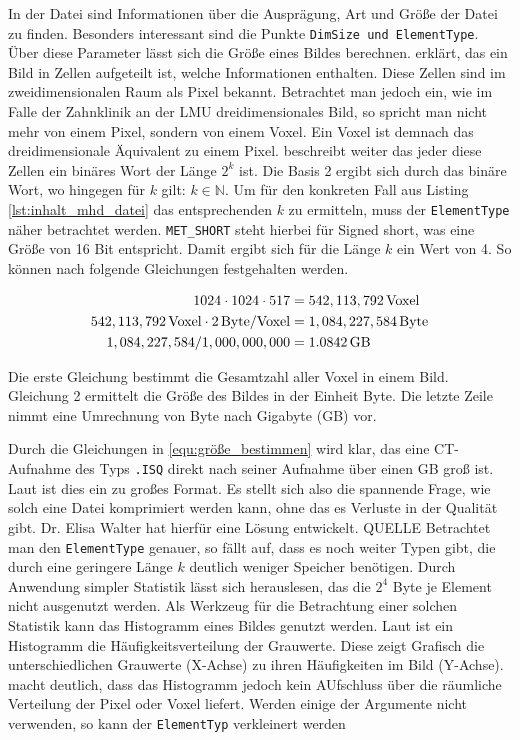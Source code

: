 In der Datei sind Informationen über die Ausprägung, Art und Größe der Datei zu finden.
Besonders interessant sind die Punkte \texttt{DimSize und ElementType}. Über
diese Parameter lässt sich die Größe eines Bildes berechnen. \citet[Seite 10-11]{burger2009}
erklärt, das ein Bild in Zellen aufgeteilt ist, welche Informationen enthalten.
Diese Zellen sind im zweidimensionalen Raum als Pixel bekannt. Betrachtet man jedoch
ein, wie im Falle der Zahnklinik an der LMU dreidimensionales Bild, so spricht man
nicht mehr von einem Pixel, sondern von einem Voxel. Ein Voxel ist demnach das dreidimensionale
Äquivalent zu einem Pixel. \citet[Seite 10-11]{burger2009} beschreibt weiter das
jeder diese Zellen ein binäres Wort der Länge $2^{k}$ ist. Die Basis 2 ergibt sich
durch das binäre Wort, wo hingegen für $k$ gilt: $k \in \mathbb{N}$. Um für den
konkreten Fall aus Listing \ref{lst:inhalt_mhd_datei} das entsprechenden $k$ zu
ermitteln, muss der \texttt{ElementType} näher betrachtet werden. \texttt{MET\_SHORT}
steht hierbei für Signed short, was eine Größe von 16 Bit entspricht. Damit
ergibt sich für die Länge $k$ ein Wert von 4. So können nach \citet[Seite 10-11]{burger2009}
folgende Gleichungen festgehalten werden.

\begin{align}
	\label{equ:größe_bestimmen}1024 \cdot 1024 \cdot 517    & = 542,113,792 \, \text{Voxel}\notag  \\
	542,113,792 \, \text{Voxel}\cdot 2 \, \text{Byte/Voxel} & = 1,084,227,584 \, \text{Byte}\notag \\
	1,084,227,584 / 1,000,000,000                           & = 1.0842 \, \text{GB}
\end{align}

Die erste Gleichung bestimmt die Gesamtzahl aller Voxel in einem Bild. Gleichung
2 ermittelt die Größe des Bildes in der Einheit Byte. Die letzte Zeile nimmt eine
Umrechnung von Byte nach Gigabyte (GB) vor.

Durch die Gleichungen in \ref{equ:größe_bestimmen} wird klar, das eine CT-Aufnahme
des Typs \texttt{.ISQ} direkt nach seiner Aufnahme über einen GB groß ist. Laut
\citet{poliklinikLMU} ist dies ein zu großes Format. Es stellt sich also die
spannende Frage, wie solch eine Datei komprimiert werden kann, ohne das es
Verluste in der Qualität gibt. Dr. Elisa Walter hat hierfür eine Lösung
entwickelt. QUELLE Betrachtet man den \texttt{ElementType} genauer, so fällt auf,
dass es noch weiter Typen gibt, die durch eine geringere Länge $k$ deutlich weniger
Speicher benötigen. Durch Anwendung simpler Statistik lässt sich herauslesen, das
die $2^{4}$ Byte je Element nicht ausgenutzt werden. Als Werkzeug für die
Betrachtung einer solchen Statistik kann das Histogramm eines Bildes genutzt
werden. Laut \citet[Seite 249]{jahne2024} ist ein Histogramm die Häufigkeitsverteilung
der Grauwerte. Diese zeigt Grafisch die unterschiedlichen Grauwerte (X-Achse) zu
ihren Häufigkeiten im Bild (Y-Achse). \citet[Seite 249]{jahne2024} macht deutlich,
dass das Histogramm jedoch kein AUfschluss über die räumliche Verteilung der
Pixel oder Voxel liefert. Werden einige der Argumente nicht verwenden, so kann
der \texttt{ElementTyp} verkleinert werden

